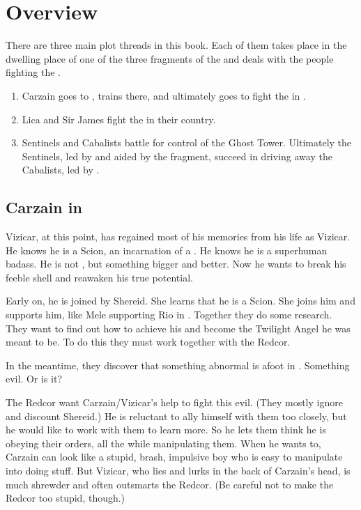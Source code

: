 \section{Overview}
There are three main plot threads in this book. 
Each of them takes place in the dwelling place of one of the three fragments of the \Haskelek{} and deals with the people fighting the \Haskelek. 

\begin{enumerate}
  \item 
    Carzain goes to \Redce{}, trains there, and ultimately goes to fight the \Haskelek{} in \Redce.
  \item
    Lica and Sir James fight the \Haskelek{} in their country.
  \item
    Sentinels and Cabalists battle for control of the Ghost Tower. 
    Ultimately the Sentinels, led by \Nzessuacrith{} and aided by the \Haskelek{} fragment, succeed in driving away the Cabalists, led by \Achsah. 
\end{enumerate}









\subsection{Carzain in \Redce}
Vizicar, at this point, has regained most of his memories from his life as Vizicar. 
He knows he is a Scion, an incarnation of a \malach. 
He knows he is a superhuman badass. 
He is not \human, but something bigger and better. 
Now he wants to break his feeble \human{} shell and reawaken his true potential. 

Early on, he is joined by Shereid. 
She learns that he is a Scion. 
She joins him and supports him, like Mele supporting Rio in \cite{Tokusatsu:Gekiranger}. 
Together they do some research. 
They want to find out how to achieve his \Apotheosis{} and become the Twilight Angel he was meant to be. 
To do this they must work together with the Redcor. 

In the meantime, they discover that something abnormal is afoot in \Redce.
Something evil. 
Or is it? 

The Redcor want Carzain/Vizicar's help to fight this evil. 
(They mostly ignore and discount Shereid.) 
He is reluctant to ally himself with them too closely, but he would like to work with them to learn more. 
So he lets them think he is obeying their orders, all the while manipulating them. 
When he wants to, Carzain can look like a stupid, brash, impulsive boy who is easy to manipulate into doing stuff. 
But Vizicar, who lies and lurks in the back of Carzain's head, is much shrewder and often outsmarts the Redcor. 
(Be careful not to make the Redcor too stupid, though.)

